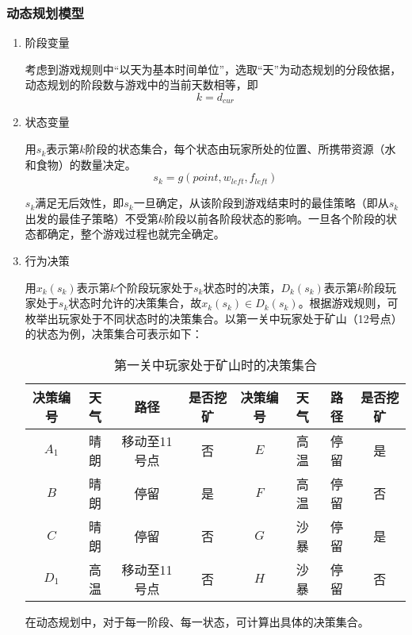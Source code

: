 \documentclass[withoutpreface,bwprint]{cumcmthesis} %
\begin{document}
\subsubsection{动态规划模型}
\begin{enumerate}
\item 阶段变量

考虑到游戏规则中“以天为基本时间单位”，选取“天”为动态规划的分段依据，动态规划的阶段数与游戏中的当前天数相等，即
\begin{equation}
    k=d_{cur}
\end{equation}

\item 状态变量

用$s_k$表示第$k$阶段的状态集合，每个状态由玩家所处的位置、所携带资源（水和食物）的数量决定。
\begin{equation}
    s_k=g(point,w_{left},f_{left})
\end{equation}

$s_k$满足无后效性，即$s_k$一旦确定，从该阶段到游戏结束时的最佳策略（即从$s_k$出发的最佳子策略）不受第$k$阶段以前各阶段状态的影响。一旦各个阶段的状态都确定，整个游戏过程也就完全确定。

\item 行为决策

用$x_k(s_k)$表示第$k$个阶段玩家处于$s_k$状态时的决策，$D_k(s_k)$表示第$k$阶段玩家处于$s_k$状态时允许的决策集合，故$x_k(s_k) \in D_k(s_k)$。根据游戏规则，可枚举出玩家处于不同状态时的决策集合。以第一关中玩家处于矿山（12号点）的状态为例，决策集合可表示如下：

\begin{table}[!htbp]
    \caption{第一关中玩家处于矿山时的决策集合}\label{tab:decisions} \centering
    \begin{tabular}{cccc|cccc}
        \toprule[1.5pt]
        决策编号 & 天气 & 路径 & 是否挖矿 & 决策编号 & 天气 & 路径 & 是否挖矿\\
        \midrule[1pt]
        $A_1$ & 晴朗 & 移动至11号点 & 否 & $E$ & 高温 & 停留 & 是\\
        $B$ & 晴朗 & 停留 & 是 & $F$ & 高温 & 停留 & 否\\
        $C$ & 晴朗 & 停留 & 否 & $G$ & 沙暴 & 停留 & 是\\
        $D_1$ & 高温 & 移动至11号点 & 否 & $H$ & 沙暴 & 停留 & 否 \\
        \bottomrule[1.5pt]
    \end{tabular}
\end{table}

在动态规划中，对于每一阶段、每一状态，可计算出具体的决策集合。


\end{enumerate}
\end{document}
